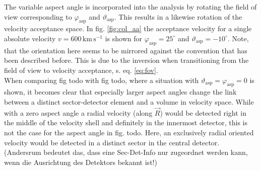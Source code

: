 The variable aspect angle is incorporated into the analysis by rotating the field of view corresponding to $\varphi_{\mathrm{asp}}$ and $\vartheta_{\mathrm{asp}}$. This results in a likewise rotation of the velocity acceptance space. In fig. \ref{fig:col_aa} the acceptance velocity for a single absolute velocity $v = 600\,\mathrm{km\,s^{-1}}$ is shown for $\varphi_\mathrm{asp} = 25^\circ$ and $\vartheta_{\mathrm{asp}} = -10^\circ $. Note, that the orientation here seems to be mirrored against the convention that has been described before. This is due to the inversion when transitioning from the field of view to velocity acceptance, s. eq. \ref{eq:fov}.\\
When comparing fig todo with fig todo, where a situation with $\vartheta_{\mathrm{asp}} = \varphi_{\mathrm{asp}} = 0$ is shown, it becomes clear that especially larger aspect angles change the link between a distinct sector-detector element and a volume in velocity space. While with a zero aspect angle a radial velocity (along $\vec{R}$) would be detected right in the middle of the velocity shell and definitely in the innermost detector, this is not the case for the aspect angle in fig. todo. Here, an exclusively radial oriented velocity would be detected in a distinct sector in the central detector. (Andersrum bedeutet das, dass eine Sec-Det-Info nur zugeordnet werden kann, wenn die Ausrichtung des Detektors bekannt ist!)

